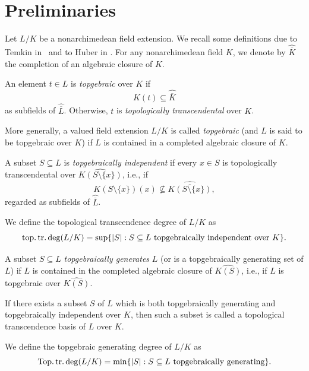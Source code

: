 \section{Preliminaries}

Let $L/K$ be a nonarchimedean field extension. We recall some definitions due to Temkin in \cite{Temkin21} and to Huber in \cite{Huber96}. For any nonarchimedean field $K$, we denote by $\widehat{\overline{K}}$ the completion of an algebraic closure of $K$. 
\begin{defn}
An element $t\in L$ is \emph{topgebraic} over $K$ if
\begin{equation*}K(t)\subseteq \widehat{\overline{K}}\end{equation*}as subfields of $\widehat{\overline{L}}$. Otherwise, $t$ is
\emph{topologically transcendental} over $K$. 

More generally, a valued field extension $L/K$ is called \emph{topgebraic} (and $L$ is said to be topgebraic over $K$) if $L$ is contained in a completed algebraic closure of $K$. 
\end{defn}
\begin{defn}A subset $S\subseteq L$ is \emph{topgebraically independent} if every $x\in S$ is topologically
transcendental over $\widehat{K(S\setminus \{x\})}$, i.e., if
\begin{equation*}
K(S\setminus \{x\})(x)\not\subseteq \widehat{\overline{K(S\setminus \{x\})}},
\end{equation*}regarded as subfields of $\widehat{\overline{L}}$. \end{defn}
\begin{defn}We define the topological transcendence degree of $L/K$ as
\begin{equation*}
\operatorname{top.tr.deg}(L/K)=\sup\{\vert S\vert : S\subseteq L \text{ topgebraically
independent over } K\}.
\end{equation*}
\end{defn}
\begin{defn}
A subset $S\subseteq L$ \emph{topgebraically generates} $L$ (or is a topgebraically generating set of $L$) if $L$ is
contained in the completed algebraic closure of $\widehat{K(S)}$, i.e., if
$L$ is topgebraic over $\widehat{K(S)}$.
\end{defn}
\begin{defn}If there exists a subset $S$ of $L$ which is both topgebraically generating and topgebraically independent over $K$, then such a subset is called a topological transcendence basis of $L$ over $K$. \end{defn} 
\begin{defn}We define the topgebraic generating degree of $L/K$ as
\begin{equation*}
\operatorname{Top.tr.deg}(L/K)=\min\{\vert S\vert : S\subseteq L \text{ topgebraically
generating}\}.
\end{equation*}
\end{defn}

